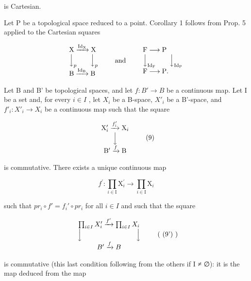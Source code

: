 is Cartesian.

Let P be a topological space reduced to a point. Corollary 1 follows from Prop. 5 applied to the Cartesian squares

\[
\begin{array}{l} \mathrm{X} \xrightarrow {\mathrm{Id} _ {\mathrm{X}}} \mathrm{X} \\ \Big \downarrow_ {p} \qquad \Big \downarrow_ {p} \\ \mathrm{B} \xrightarrow {\mathrm{Id} _ {\mathrm{B}}} \mathrm{B} \end{array} \qquad \text {and} \qquad \begin{array}{l} \mathrm{F} \longrightarrow \mathrm{P} \\ \Big \downarrow_ {\mathrm{Id} _ {\mathrm{F}}} \qquad \Big \downarrow_ {\mathrm{Id} _ {\mathrm{P}}} \\ \mathrm{F} \longrightarrow \mathrm{P}. \end{array}
\]

Let B and B' be topological spaces, and let \(f: B' \to B\) be a continuous map. Let I be a set and, for every \(i \in I\) , let \(X_i\) be a B-space, \(X'_i\) be a B'-space, and \(f'_i: X'_i \to X_i\) be a continuous map such that the square

\[
\begin{array}{c} \mathrm{X} _ {i} ^ {\prime} \xrightarrow {f _ {i} ^ {\prime}} \mathrm{X} _ {i} \\ \Big \downarrow \\ \mathrm{B} ^ {\prime} \xrightarrow {f} \mathrm{B} \end{array}\tag{9}
\]

is commutative. There exists a unique continuous map

\[
f ^ {\prime} \colon \prod_ {i \in \mathrm{I}} \mathrm{X} _ {i} ^ {\prime} \to \prod_ {i \in \mathrm{I}} \mathrm{X} _ {i}
\]

such that \(pr_{i} \circ f' = f_{i}' \circ pr_{i}\) for all \(i \in I\) and such that the square

\[
\begin{array}{c} \prod_ {i \in I} X _ {i} ^ {\prime} \xrightarrow {f ^ {\prime}} \prod_ {i \in I} X _ {i} \\ \Big \downarrow \qquad \qquad \qquad \qquad \Big \downarrow \\ B ^ {\prime} \xrightarrow {f} B \end{array}\tag{ (9') }
\]

is commutative (this last condition following from the others if I ≠ ∅): it is the map deduced from the map

